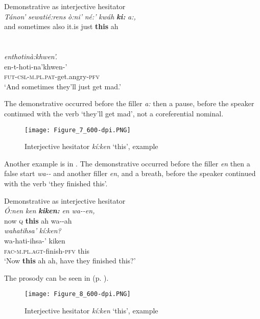 \documentclass[output=paper]{langscibook}
\begin{document}
\ea%
\label{ex:mithun:15}
Demonstrative as interjective hesitator\\
\gll \textit{Tánon’}  \textit{sewatié:rens}  \textit{ò:ni’}  \textit{né:’}    \textit {kwáh} \textbf{\textit{ki:}} \textit{a:,}\\
and      sometimes    also    it.is    just    \textbf{this}    ah\\~\\~\\
\glll \textit{enthotinà:khwen’.}\\
en-t-hoti-na’khwen-’\\
\textsc{fut-csl-m.pl.pat}{}-get.angry-\textsc{pfv}\\
\glt ‘And sometimes they’ll just get mad.’\\      
\z

The demonstrative occurred before the filler \textit{a:} then a pause, before the speaker continued with the verb ‘they’ll get mad’, not a coreferential nominal.

\begin{figure}
\texttt{[image: Figure\_7\_600-dpi.PNG]}
\caption{Interjective hesitator \textit{kí:ken} ‘this’, example }
\label{fig:mithun:7}
\end{figure}

Another example is in . The demonstrative occurred before the filler \textit{en} then a false start \textit{wa-{}-} and another filler \textit{en}, and a breath, before the speaker continued with the verb ‘they finished this’. 

\ea%
    \label{ex:mithun:16}
Demonstrative as interjective hesitator\\
\glllll \textit{Ó:nen} \textit{ken} \textbf{\textit{kiken:}} \textit{en} \textit{wa-{}-en,}\\
now        \textsc{q}    \textbf{this}       ah       wa-{}-ah\\
\textit{wahatihsa’}                  \textit{kí:ken?}\\
wa-hati-ihsa-’             kiken\\
\textsc{fac-m.pl.agt-}finish-\textsc{pfv}  this  \\
\glt ‘Now \textbf{this} ah ah, have they finished this?’\\
\z

The prosody can be seen in  (p. \pageref{fig:mithun:8}).

\begin{figure}
\texttt{[image: Figure\_8\_600-dpi.PNG]}
\caption{Interjective hesitator \textit{kí:ken} ‘this’, example }
\label{fig:mithun:8}
\end{figure}
\end{document}

